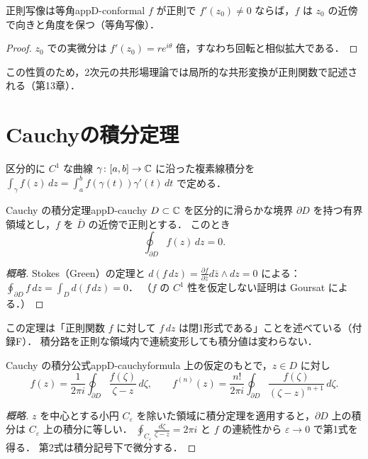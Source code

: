 \begin{myprop}{正則写像は等角}{appD-conformal}
$f$ が正則で $f'(z_0)\ne0$ ならば，$f$ は $z_0$ の近傍で向きと角度を保つ（等角写像）．
\end{myprop}
\begin{proof}
$z_0$ での実微分は $f'(z_0)=re^{i\theta}$ 倍，すなわち回転と相似拡大である．
\end{proof}

この性質のため，2次元の共形場理論では局所的な共形変換が正則関数で記述される（第13章）．

\section{Cauchyの積分定理}

区分的に $C^1$ な曲線 $\gamma\colon[a,b]\to\mathbb{C}$ に沿った複素線積分を
$\int_\gamma f(z)\,dz=\int_a^bf(\gamma(t))\gamma'(t)\,dt$ で定める．

\begin{mythm}{Cauchy の積分定理}{appD-cauchy}
$D\subset\mathbb{C}$ を区分的に滑らかな境界 $\partial D$ を持つ有界領域とし，$f$ を $\bar D$ の近傍で正則とする．
このとき
\[
\oint_{\partial D}f(z)\,dz=0 .
\]
\end{mythm}
\begin{proof}[概略]
Stokes（Green）の定理と $d(f\,dz)=\frac{\partial f}{\partial\bar z}d\bar z\wedge dz=0$ による：
$\oint_{\partial D}f\,dz=\int_Dd(f\,dz)=0$．
（$f$ の $C^1$ 性を仮定しない証明は Goursat による．）
\end{proof}

この定理は「正則関数 $f$ に対して $f\,dz$ は閉1形式である」ことを述べている（付録F）．
積分路を正則な領域内で連続変形しても積分値は変わらない．

\begin{mythm}{Cauchy の積分公式}{appD-cauchyformula}
上の仮定のもとで，$z\in D$ に対し
\[
f(z)=\frac1{2\pi i}\oint_{\partial D}\frac{f(\zeta)}{\zeta-z}\,d\zeta,\qquad
f^{(n)}(z)=\frac{n!}{2\pi i}\oint_{\partial D}\frac{f(\zeta)}{(\zeta-z)^{n+1}}\,d\zeta .
\]
\end{mythm}
\begin{proof}[概略]
$z$ を中心とする小円 $C_\varepsilon$ を除いた領域に積分定理を適用すると，$\partial D$ 上の積分は $C_\varepsilon$ 上の積分に等しい．
$\oint_{C_\varepsilon}\frac{d\zeta}{\zeta-z}=2\pi i$ と $f$ の連続性から $\varepsilon\to0$ で第1式を得る．
第2式は積分記号下で微分する．
\end{proof}

